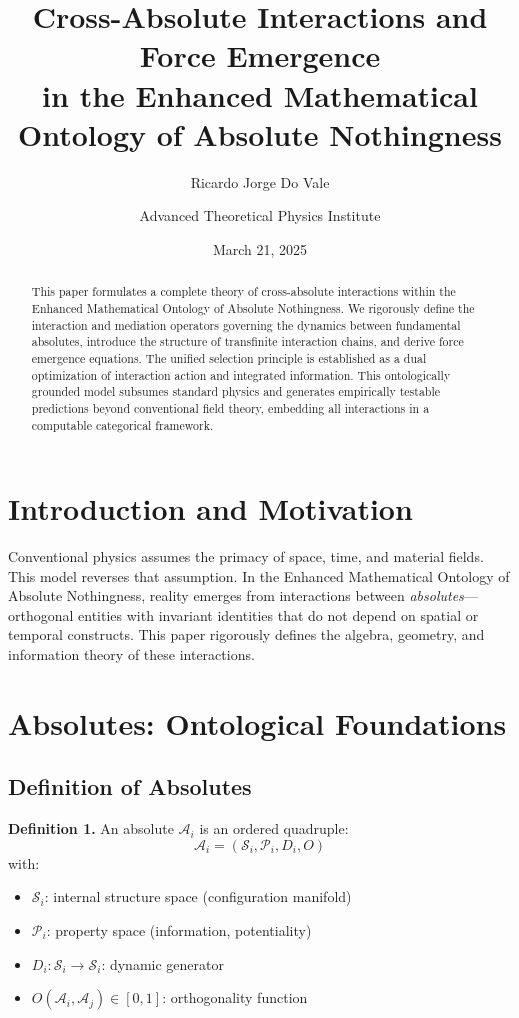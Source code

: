 \documentclass[11pt]{article}
\title{\textbf{Cross-Absolute Interactions and Force Emergence\\in the Enhanced Mathematical Ontology of Absolute Nothingness}}
\author[1]{Ricardo Jorge Do Vale}
\author[1]{Advanced Theoretical Physics Institute}
\date{March 21, 2025}
\begin{document}
\maketitle

\begin{abstract}
This paper formulates a complete theory of cross-absolute interactions within the Enhanced Mathematical Ontology of Absolute Nothingness. We rigorously define the interaction and mediation operators governing the dynamics between fundamental absolutes, introduce the structure of transfinite interaction chains, and derive force emergence equations. The unified selection principle is established as a dual optimization of interaction action and integrated information. This ontologically grounded model subsumes standard physics and generates empirically testable predictions beyond conventional field theory, embedding all interactions in a computable categorical framework.
\end{abstract}

\tableofcontents
\newpage

\section{Introduction and Motivation}

Conventional physics assumes the primacy of space, time, and material fields. This model reverses that assumption. In the Enhanced Mathematical Ontology of Absolute Nothingness, reality emerges from interactions between \emph{absolutes}—orthogonal entities with invariant identities that do not depend on spatial or temporal constructs. This paper rigorously defines the algebra, geometry, and information theory of these interactions.

\section{Absolutes: Ontological Foundations}

\subsection{Definition of Absolutes}

\textbf{Definition 1.} An absolute $\mathcal{A}_i$ is an ordered quadruple:
\[
\mathcal{A}_i = \left( \mathcal{S}_i, \mathcal{P}_i, D_i, O \right)
\]
with:
\begin{itemize}[noitemsep]
    \item $\mathcal{S}_i$: internal structure space (configuration manifold)
    \item $\mathcal{P}_i$: property space (information, potentiality)
    \item $D_i: \mathcal{S}_i \rightarrow \mathcal{S}_i$: dynamic generator
    \item $O(\mathcal{A}_i, \mathcal{A}_j) \in [0,1]$: orthogonality function
\end{itemize}
\end{document}
